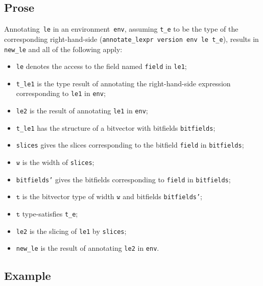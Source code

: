\documentclass{book}
\newcommand\vt[0]{\texttt{t}}
\newcommand\vw[0]{\texttt{w}}
\begin{document}
\begin{itemize}
    \subsection{Prose}
   Annotating~\texttt{le} in an environment~\texttt{env}, assuming
\texttt{t\_e} to be the type of the corresponding right-hand-side
(\texttt{annotate\_lexpr version env le t\_e}), results in \texttt{new\_le} and
all of the following apply:
   \begin{itemize}
   \item \texttt{le} denotes the access to the field named \texttt{field} in \texttt{le1};
   \item \texttt{t\_le1} is the type result of annotating the right-hand-side expression corresponding to \texttt{le1} in \texttt{env};
   \item \texttt{le2} is the result of annotating \texttt{le1} in \texttt{env};
   \item \texttt{t\_le1} has the structure of a bitvector with bitfields \texttt{bitfields};
   \item \texttt{slices} gives the slices corresponding to the bitfield \texttt{field} in
      \texttt{bitfields};
   \item $\vw$ is the width of \texttt{slices};
   \item \texttt{bitfields'} gives the bitfields corresponding to \texttt{field} in \texttt{bitfields};
   \item $\vt$ is the bitvector type of width $\vw$ and bitfields \texttt{bitfields'};
   \item $\vt$ type-satisfies \texttt{t\_e};
   \item \texttt{le2} is the slicing of \texttt{le1} by \texttt{slices};
   \item \texttt{new\_le} is the result of annotating \texttt{le2} in \texttt{env}.
   \end{itemize}

  \subsection{Example}



\begin{emptyformal}

\end{emptyformal}
\end{itemize}
\end{document}
